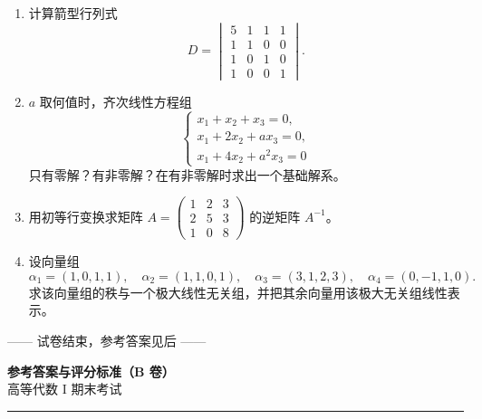\documentclass[12pt]{ctexart}
\begin{document}
\begin{enumerate}[label=\arabic*.]
\item 计算箭型行列式
  \[
  D=\begin{vmatrix}
  5 & 1 & 1 & 1\\
  1 & 1 & 0 & 0\\
  1 & 0 & 1 & 0\\
  1 & 0 & 0 & 1
  \end{vmatrix}.
  \]

\item $a$ 取何值时，齐次线性方程组
  \[
  \begin{cases}
  x_1+x_2+x_3=0,\\
  x_1+2x_2+a x_3=0,\\
  x_1+4x_2+a^{2}x_3=0
  \end{cases}
  \]
  只有零解？有非零解？在有非零解时求出一个基础解系。

\item 用初等行变换求矩阵 $A=\begin{pmatrix}1&2&3\\ 2&5&3\\ 1&0&8\end{pmatrix}$ 的逆矩阵 $A^{-1}$。

\item 设向量组
  \[
  \alpha_1=(1,0,1,1),\quad \alpha_2=(1,1,0,1),\quad \alpha_3=(3,1,2,3),\quad \alpha_4=(0,-1,1,0).
  \]
  求该向量组的秩与一个极大线性无关组，并把其余向量用该极大无关组线性表示。
\end{enumerate}

\vspace{8pt}
\begin{center}\small —— 试卷结束，参考答案见后 ——\end{center}

\clearpage
\begin{center}
  {\Large\bfseries 参考答案与评分标准（B 卷）}\\[2pt]
  {\small 高等代数 I 期末考试}
\end{center}
\vspace{6pt}\hrule\vspace{12pt}
\end{document}
